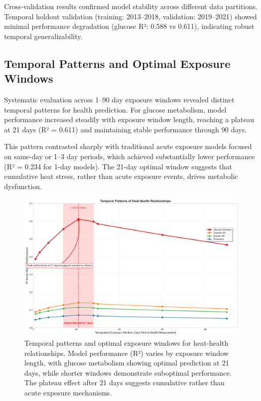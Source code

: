 \documentclass[11pt,a4paper]{article}
\begin{document}
Cross-validation results confirmed model stability across different data partitions. Temporal holdout validation (training: 2013--2018, validation: 2019--2021) showed minimal performance degradation (glucose R²: 0.588 vs 0.611), indicating robust temporal generalizability.

\subsection{Temporal Patterns and Optimal Exposure Windows}

Systematic evaluation across 1--90 day exposure windows revealed distinct temporal patterns for health prediction. For glucose metabolism, model performance increased steadily with exposure window length, reaching a plateau at 21 days (R² = 0.611) and maintaining stable performance through 90 days.

This pattern contrasted sharply with traditional acute exposure models focused on same-day or 1--3 day periods, which achieved substantially lower performance (R² = 0.234 for 1-day models). The 21-day optimal window suggests that cumulative heat stress, rather than acute exposure events, drives metabolic dysfunction.

\begin{figure}[ht]
\centering
\includegraphics[width=1.0\textwidth]{heat_analysis_optimized/analysis/Figure2_TemporalPatterns_Fixed.png}
\caption{Temporal patterns and optimal exposure windows for heat-health relationships. Model performance (R²) varies by exposure window length, with glucose metabolism showing optimal prediction at 21 days, while shorter windows demonstrate suboptimal performance. The plateau effect after 21 days suggests cumulative rather than acute exposure mechanisms.}
\label{fig:temporal_patterns}
\end{figure}
\end{document}

